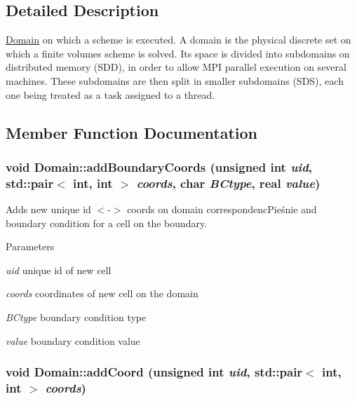 \subsection{Detailed Description}
\hyperlink{classDomain}{Domain} on which a scheme is executed. A domain is the physical discrete set on which a finite volumes scheme is solved. Its space is divided into subdomains on distributed memory (SDD), in order to allow MPI parallel execution on several machines. These subdomains are then split in smaller subdomains (SDS), each one being treated as a task assigned to a thread. 

\subsection{Member Function Documentation}
\hypertarget{classDomain_a139f4270151467a3380922e98c644f79}{
\subsubsection[{addBoundaryCoords}]{\setlength{\rightskip}{0pt plus 5cm}void Domain::addBoundaryCoords (unsigned int {\em uid}, \/  std::pair$<$ int, int $>$ {\em coords}, \/  char {\em BCtype}, \/  real {\em value})}}
\label{classDomain_a139f4270151467a3380922e98c644f79}


Adds new unique id $<$-\/$>$ coords on domain correspondencPieśnie and boundary condition for a cell on the boundary. 
\begin{DoxyParams}{Parameters}
\item[{\em uid}]unique id of new cell \item[{\em coords}]coordinates of new cell on the domain \item[{\em BCtype}]boundary condition type \item[{\em value}]boundary condition value \end{DoxyParams}
\hypertarget{classDomain_a1463e043dbcda6e6755dda83c26d6b73}{
\subsubsection[{addCoord}]{\setlength{\rightskip}{0pt plus 5cm}void Domain::addCoord (unsigned int {\em uid}, \/  std::pair$<$ int, int $>$ {\em coords})}}
\label{classDomain_a1463e043dbcda6e6755dda83c26d6b73}


